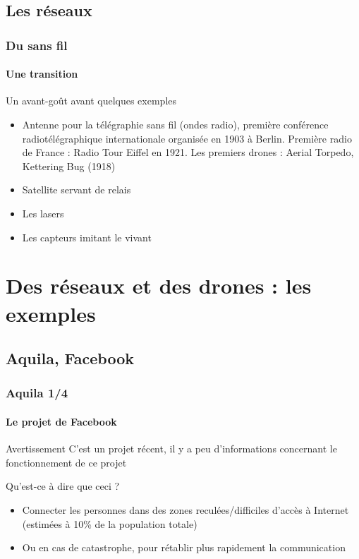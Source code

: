 \documentclass{beamer}
\begin{document}
\subsection{Les réseaux}
\begin{frame}
  \frametitle{Du sans fil}
  \framesubtitle{Une transition}
  \begin{block}{Un avant-goût avant quelques exemples}
    \begin{itemize}
      \item Antenne pour la télégraphie sans fil (ondes radio), première conférence radiotélégraphique internationale organisée en 1903 à Berlin. Première radio de France : Radio Tour Eiffel en 1921. Les premiers drones : Aerial Torpedo, Kettering Bug (1918)
      \item Satellite servant de relais
      \item Les lasers
      \item Les capteurs imitant le vivant
    \end{itemize}
  \end{block}
\end{frame}

\section{Des réseaux et des drones : les exemples}
\begin{frame}
	\tableofcontents[currentsection]
\end{frame}

\subsection{Aquila, Facebook}
\begin{frame}
  \frametitle{Aquila 1/4}
  \framesubtitle{Le projet de Facebook}
  \begin{alertblock}{Avertissement}
    C'est un projet récent, il y a peu d'informations concernant le fonctionnement de ce projet
  \end{alertblock}
  \begin{block}{Qu'est-ce à dire que ceci ?}
    \begin{itemize}
      \item Connecter les personnes dans des zones reculées/difficiles d'accès à Internet (estimées à 10\% de la population totale)
      \item Ou en cas de catastrophe, pour rétablir plus rapidement la communication
    \end{itemize}
  \end{block}
\end{frame}
\end{document}
